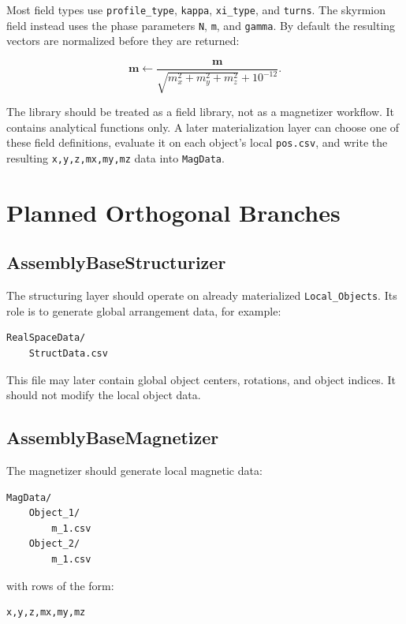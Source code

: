 \documentclass[11pt,a4paper]{article}
\begin{document}
Most field types use \texttt{profile\_type}, \texttt{kappa},
\texttt{xi\_type}, and \texttt{turns}. The skyrmion field instead uses the
phase parameters \texttt{N}, \texttt{m}, and \texttt{gamma}. By default the
resulting vectors are normalized before they are returned:

\[
    \mathbf{m} \leftarrow
    \frac{\mathbf{m}}{\sqrt{m_x^2 + m_y^2 + m_z^2} + 10^{-12}} .
\]

The library should be treated as a field library, not as a magnetizer workflow.
It contains analytical functions only. A later materialization layer can choose
one of these field definitions, evaluate it on each object's local
\texttt{pos.csv}, and write the resulting \texttt{x,y,z,mx,my,mz} data into
\texttt{MagData}.

\section{Planned Orthogonal Branches}

\subsection{AssemblyBaseStructurizer}

The structuring layer should operate on already materialized
\texttt{Local\_Objects}. Its role is to generate global arrangement data, for
example:

\begin{lstlisting}
RealSpaceData/
    StructData.csv
\end{lstlisting}

This file may later contain global object centers, rotations, and object
indices. It should not modify the local object data.

\subsection{AssemblyBaseMagnetizer}

The magnetizer should generate local magnetic data:

\begin{lstlisting}
MagData/
    Object_1/
        m_1.csv
    Object_2/
        m_1.csv
\end{lstlisting}

with rows of the form:

\begin{lstlisting}
x,y,z,mx,my,mz
\end{lstlisting}
\end{document}
